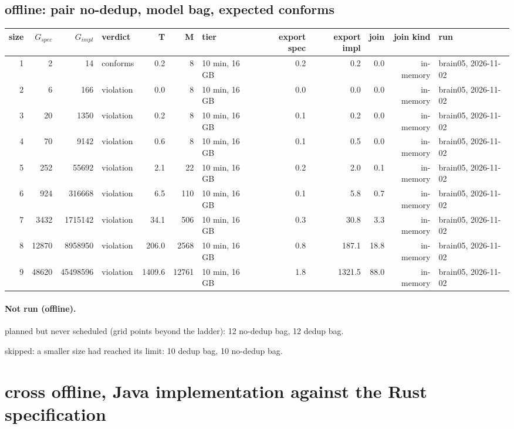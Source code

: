 \documentclass[10pt]{article}
\begin{document}
\subsection*{offline: pair \textsf{no-dedup}, model bag, expected conforms}
\begin{longtable}{@{}rrrlrrlrrrrl@{}}
\toprule
size & $G_{\mathit{spec}}$ & $G_{\mathit{impl}}$ & verdict & T & M & tier & export spec & export impl & join & join kind & run \\
\midrule
\endhead
\color{red} 1 & 2 & 14 & conforms & 0.2 & 8 & 10 min, 16 GB & 0.2 & 0.2 & 0.0 & in-memory & brain05, 2026-11-02 \\
\color{red} 2 & 6 & 166 & violation & 0.0 & 8 & 10 min, 16 GB & 0.0 & 0.0 & 0.0 & in-memory & brain05, 2026-11-02 \\
\color{red} 3 & 20 & 1350 & violation & 0.2 & 8 & 10 min, 16 GB & 0.1 & 0.2 & 0.0 & in-memory & brain05, 2026-11-02 \\
\color{red} 4 & 70 & 9142 & violation & 0.6 & 8 & 10 min, 16 GB & 0.1 & 0.5 & 0.0 & in-memory & brain05, 2026-11-02 \\
\color{red} 5 & 252 & 55692 & violation & 2.1 & 22 & 10 min, 16 GB & 0.2 & 2.0 & 0.1 & in-memory & brain05, 2026-11-02 \\
\color{red} 6 & 924 & 316668 & violation & 6.5 & 110 & 10 min, 16 GB & 0.1 & 5.8 & 0.7 & in-memory & brain05, 2026-11-02 \\
\color{red} 7 & 3432 & 1715142 & violation & 34.1 & 506 & 10 min, 16 GB & 0.3 & 30.8 & 3.3 & in-memory & brain05, 2026-11-02 \\
\color{red} 8 & 12870 & 8958950 & violation & 206.0 & 2568 & 10 min, 16 GB & 0.8 & 187.1 & 18.8 & in-memory & brain05, 2026-11-02 \\
\color{red} 9 & 48620 & 45498596 & violation & 1409.6 & 12761 & 10 min, 16 GB & 1.8 & 1321.5 & 88.0 & in-memory & brain05, 2026-11-02 \\
\bottomrule
\end{longtable}
\paragraph{Not run (offline).}
planned but never scheduled (grid points beyond the ladder): 12 no-dedup bag, 12 dedup bag.\par
skipped: a smaller size had reached its limit: 10 dedup bag, 10 no-dedup bag.\par
\section*{cross offline, Java implementation against the Rust specification}
\end{document}
